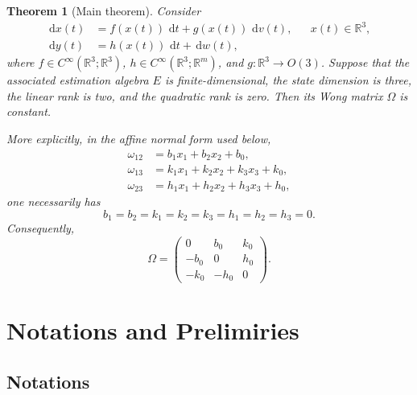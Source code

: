 \documentclass[11pt,a4paper]{article}
\numberwithin{equation}{section}
\theoremstyle{journalplain}
\newtheorem{theorem}{Theorem}[section]
\theoremstyle{journaldef}
\newcommand{\R}{\mathbb R}
\newcommand{\dd}{\,\mathrm d}
\begin{document}
\begin{samepage}
\begin{theorem}[Main theorem]\label{thm:main}
Consider
\begin{align}
\dd x(t)&=f(x(t))\,\dd t+g(x(t))\,\dd v(t),
       &&x(t)\in\R^3,\label{eq:filter-x}\\
\dd y(t)&=h(x(t))\,\dd t+\dd w(t),\label{eq:filter-y}
\end{align}
where $f\in C^\infty(\R^3;\R^3)$,
$h\in C^\infty(\R^3;\R^m)$, and $g\colon\R^3\to O(3)$.  Suppose that the
associated estimation algebra $E$ is finite-dimensional, the state dimension
is three, the linear rank is two, and the quadratic rank is zero.  Then its
Wong matrix $\Omega$ is constant.

More explicitly, in the affine normal form used below,
\begin{align}
\omega_{12}&=b_1x_1+b_2x_2+b_0,\label{eq:affine-w12-general}\\
\omega_{13}&=k_1x_1+k_2x_2+k_3x_3+k_0,\label{eq:affine-w13}\\
\omega_{23}&=h_1x_1+h_2x_2+h_3x_3+h_0,\label{eq:affine-w23}
\end{align}
one necessarily has
\[
b_1=b_2=k_1=k_2=k_3 = h_1 =h_2=h_3=0.
\]
Consequently,
\[
\Omega=
\begin{pmatrix}
0&b_0&k_0\\
-b_0&0&h_0\\
-k_0&-h_0&0
\end{pmatrix}.
\]
\end{theorem}
\end{samepage}


\section{Notations and Prelimiries}

\subsection{Notations}
\end{document}
